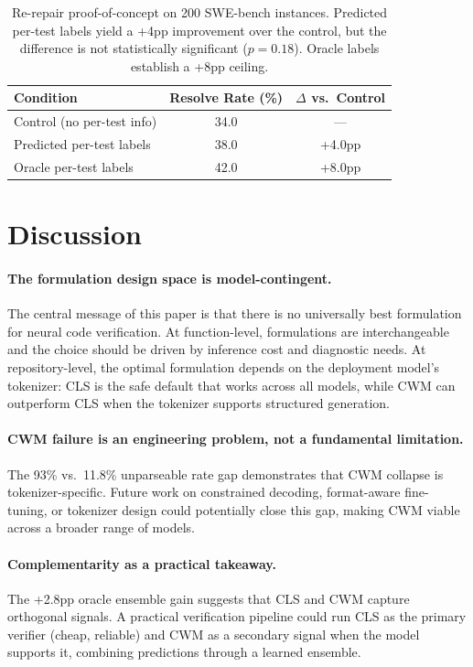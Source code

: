 \documentclass[11pt,a4paper]{article}
\begin{document}
\begin{table}[t]
\centering
\small
\caption{Re-repair proof-of-concept on 200 SWE-bench instances. Predicted per-test labels yield a +4pp improvement over the control, but the difference is not statistically significant ($p{=}0.18$). Oracle labels establish a +8pp ceiling.}
\label{tab:rerepair}
\begin{tabular}{lcc}
\toprule
Condition & Resolve Rate (\%) & $\Delta$ vs.\ Control \\
\midrule
Control (no per-test info) & 34.0 & --- \\
Predicted per-test labels & 38.0 & +4.0pp \\
Oracle per-test labels & 42.0 & +8.0pp \\
\bottomrule
\end{tabular}
\end{table}

\section{Discussion}
\label{sec:discussion}

\paragraph{The formulation design space is model-contingent.}
The central message of this paper is that there is no universally best formulation for neural code verification.
At function-level, formulations are interchangeable and the choice should be driven by inference cost and diagnostic needs.
At repository-level, the optimal formulation depends on the deployment model's tokenizer: CLS is the safe default that works across all models, while CWM can outperform CLS when the tokenizer supports structured generation.

\paragraph{CWM failure is an engineering problem, not a fundamental limitation.}
The 93\% vs.\ 11.8\% unparseable rate gap demonstrates that CWM collapse is tokenizer-specific.
Future work on constrained decoding, format-aware fine-tuning, or tokenizer design could potentially close this gap, making CWM viable across a broader range of models.

\paragraph{Complementarity as a practical takeaway.}
The +2.8pp oracle ensemble gain suggests that CLS and CWM capture orthogonal signals.
A practical verification pipeline could run CLS as the primary verifier (cheap, reliable) and CWM as a secondary signal when the model supports it, combining predictions through a learned ensemble.
\end{document}
